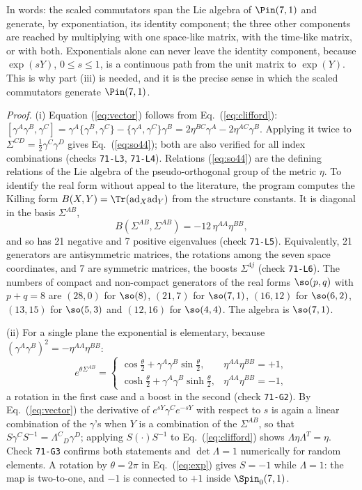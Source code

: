 In words: the scaled commutators span the Lie algebra of $\Pin(7,1)$ and generate, by exponentiation,
its identity component; the three other components are reached by multiplying with one space-like
matrix, with the time-like matrix, or with both. Exponentials alone can never leave the identity
component, because $\exp(sY)$, $0\le s\le1$, is a continuous path from the unit matrix to $\exp(Y)$.
This is why part (iii) is needed, and it is the precise sense in which the scaled commutators generate
$\Pin(7,1)$.

\emph{Proof.} (i) Equation (\ref{eq:vector}) follows from Eq.~(\ref{eq:clifford}):
$[\gamma^A\gamma^B,\gamma^C]=\gamma^A\{\gamma^B,\gamma^C\}-\{\gamma^A,\gamma^C\}\gamma^B
=2\eta^{BC}\gamma^A-2\eta^{AC}\gamma^B$. Applying it twice to $\Sigma^{CD}=\tfrac12\gamma^C\gamma^D$
gives Eq.~(\ref{eq:so44}); both are also verified for all index combinations (checks
\texttt{71-L3}, \texttt{71-L4}). Relations (\ref{eq:so44}) are the defining relations of the Lie
algebra of the pseudo-orthogonal group of the metric $\eta$. To identify the real form without appeal
to the literature, the program computes the Killing form
$B(X,Y)=\Tr(\mathrm{ad}_X\mathrm{ad}_Y)$ from the structure constants. It is diagonal in the basis
$\Sigma^{AB}$,
\begin{equation}
B(\Sigma^{AB},\Sigma^{AB})=-12\,\eta^{AA}\eta^{BB},
\label{eq:killing}
\end{equation}
and so has 21 negative and 7 positive eigenvalues (check \texttt{71-L5}). Equivalently, 21 generators
are antisymmetric matrices, the rotations among the seven space coordinates, and 7 are symmetric
matrices, the boosts $\Sigma^{4j}$ (check \texttt{71-L6}). The numbers of compact and non-compact
generators of the real forms $\so(p,q)$ with $p+q=8$ are $(28,0)$ for $\so(8)$, $(21,7)$ for
$\so(7,1)$, $(16,12)$ for $\so(6,2)$, $(13,15)$ for $\so(5,3)$ and $(12,16)$ for $\so(4,4)$. The
algebra is $\so(7,1)$.

(ii) For a single plane the exponential is elementary, because
$(\gamma^A\gamma^B)^2=-\eta^{AA}\eta^{BB}$:
\begin{equation}
e^{\theta\Sigma^{AB}}=\begin{cases}\cos\frac\theta2+\gamma^A\gamma^B\sin\frac\theta2,&\eta^{AA}\eta^{BB}=+1,\\[3pt]
\cosh\frac\theta2+\gamma^A\gamma^B\sinh\frac\theta2,&\eta^{AA}\eta^{BB}=-1,\end{cases}
\label{eq:exp}
\end{equation}
a rotation in the first case and a boost in the second (check \texttt{71-G2}). By
Eq.~(\ref{eq:vector}) the derivative of $e^{sY}\gamma^Ce^{-sY}$ with respect to $s$ is again a linear
combination of the $\gamma$'s when $Y$ is a combination of the $\Sigma^{AB}$, so that
$S\gamma^CS^{-1}=\Lambda^C{}_D\gamma^D$; applying $S(\cdot)S^{-1}$ to Eq.~(\ref{eq:clifford}) shows
$\Lambda\eta\Lambda^T=\eta$. Check \texttt{71-G3} confirms both statements and $\det\Lambda=1$
numerically for random elements. A rotation by $\theta=2\pi$ in Eq.~(\ref{eq:exp}) gives $S=-1$ while
$\Lambda=1$: the map is two-to-one, and $-1$ is connected to $+1$ inside $\Spin_0(7,1)$.

